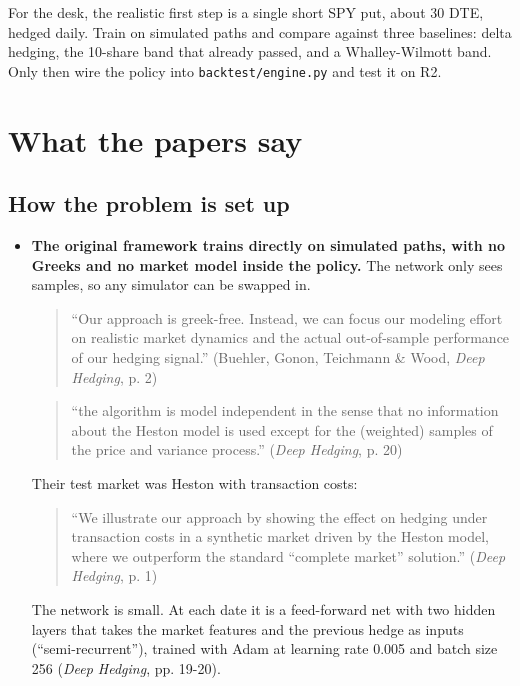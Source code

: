 \documentclass{article}
\begin{document}
For the desk, the realistic first step is a single short SPY put, about 30 DTE, hedged daily. Train on simulated paths and compare against three baselines: delta hedging, the 10-share band that already passed, and a Whalley-Wilmott band. Only then wire the policy into \texttt{backtest/\allowbreak{}engine.\allowbreak{}py} and test it on R2.

\section{What the papers say}

\subsection{How the problem is set up}

\begin{itemize}

\item \textbf{The original framework trains directly on simulated paths, with no Greeks and no market model inside the policy.} The network only sees samples, so any simulator can be swapped in.

\begin{quote}``Our approach is greek-free. Instead, we can focus our modeling effort on realistic market dynamics and the actual out-of-sample performance of our hedging signal.'' (Buehler, Gonon, Teichmann \& Wood, \emph{Deep Hedging}, p. 2)\end{quote}

\begin{quote}``the algorithm is model independent in the sense that no information about the Heston model is used except for the (weighted) samples of the price and variance process.'' (\emph{Deep Hedging}, p. 20)\end{quote}

Their test market was Heston with transaction costs:

\begin{quote}``We illustrate our approach by showing the effect on hedging under transaction costs in a synthetic market driven by the Heston model, where we outperform the standard ``complete market'' solution.'' (\emph{Deep Hedging}, p. 1)\end{quote}

The network is small. At each date it is a feed-forward net with two hidden layers that takes the market features and the previous hedge as inputs (``semi-recurrent''), trained with Adam at learning rate 0.005 and batch size 256 (\emph{Deep Hedging}, pp. 19-20).


\end{itemize}
\end{document}
